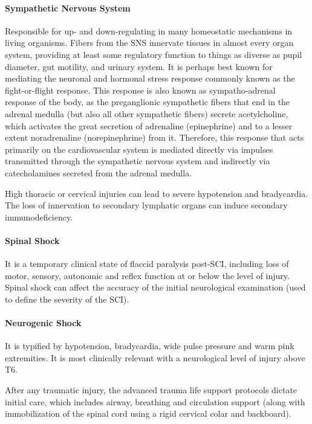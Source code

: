 \documentclass[12pt,article,oneside,a4paper]{memoir}
\begin{document}
\paragraph{Sympathetic Nervous System} Responsible for up- and down-regulating in many homeostatic mechanisms in living organisms. Fibers from the SNS innervate tissues in almost every organ system, providing at least some regulatory function to things as diverse as pupil diameter, gut motility, and urinary system. It is perhaps best known for mediating the neuronal and hormonal stress response commonly known as the fight-or-flight response. This response is also known as sympatho-adrenal response of the body, as the preganglionic sympathetic fibers that end in the adrenal medulla (but also all other sympathetic fibers) secrete acetylcholine, which activates the great secretion of adrenaline (epinephrine) and to a lesser extent noradrenaline (norepinephrine) from it. Therefore, this response that acts primarily on the cardiovascular system is mediated directly via impulses transmitted through the sympathetic nervous system and indirectly via catecholamines secreted from the adrenal medulla.

High thoracic or cervical injuries can lead to severe hypotension and bradycardia. The loss of innervation to secondary lymphatic organs can induce secondary immunodeficiency.

\paragraph{Spinal Shock} It is a temporary clinical state of flaccid paralysis post-SCI, including loss of motor, sensory, autonomic and reflex function at or below the level of injury. Spinal shock can affect the accuracy of the initial neurological examination (used to define the severity of the SCI).

\paragraph{Neurogenic Shock}
It is typified by hypotension, bradycardia, wide pulse pressure and warm pink
extremities. It is most clinically relevant with a neurological level of injury
above T6.

After any traumatic injury, the advanced trauma life support protocols dictate
initial care, which includes airway, breathing and circulation support (along
with immobilization of the spinal cord using a rigid cervical colar and backboard).
\end{document}
